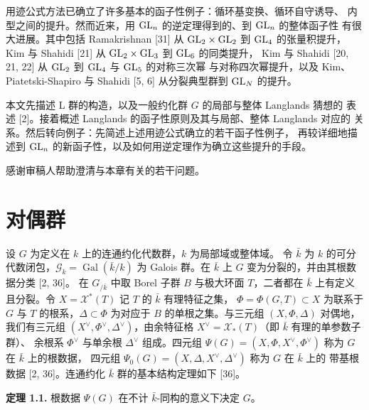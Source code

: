 用迹公式方法已确立了许多基本的函子性例子：循环基变换、循环自守诱导、
内型之间的提升。然而近来，用 $\mathrm{GL}_n$ 的逆定理得到的、到 $\mathrm{GL}_n$ 的整体函子性
有很大进展。其中包括 Ramakrishnan [31] 从 $\mathrm{GL}_2\times\mathrm{GL}_2$ 到 $\mathrm{GL}_4$
的张量积提升，Kim 与 Shahidi [21] 从 $\mathrm{GL}_2\times\mathrm{GL}_3$ 到 $\mathrm{GL}_6$ 的同类提升，
Kim 与 Shahidi [20, 21, 22] 从 $\mathrm{GL}_2$ 到 $\mathrm{GL}_4$ 与 $\mathrm{GL}_5$ 的对称三次幂
与对称四次幂提升，以及 Kim、Piatetski-Shapiro 与 Shahidi [5, 6]
从分裂典型群到 $\mathrm{GL}_N$ 的提升。

本文先描述 L 群的构造，以及一般约化群 $G$ 的局部与整体 Langlands 猜想的
表述 [2]。接着概述 Langlands 的函子性原则及其与局部、整体 Langlands 对应的
关系。然后转向例子：先简述上述用迹公式确立的若干函子性例子，
再较详细地描述到 $\mathrm{GL}_n$ 的新函子性，以及如何用逆定理作为确立这些提升的手段。

感谢审稿人帮助澄清与本章有关的若干问题。

\section{对偶群}

设 $G$ 为定义在 $k$ 上的连通约化代数群，$k$ 为局部域或整体域。
令 $\bar k$ 为 $k$ 的可分代数闭包，$\mathcal{G}_k=\operatorname{Gal}(\bar k/k)$
为 Galois 群。在 $\bar k$ 上 $G$ 变为分裂的，并由其根数据分类 [2, 36]。
在 $G_{/\bar k}$ 中取 Borel 子群 $B$ 与极大环面 $T$，二者都在 $\bar k$ 上有定义
且分裂。令 $X=\mathcal{X}^{*}(T)$ 记 $T$ 的 $\bar k$ 有理特征之集，
$\Phi=\Phi(G,T)\subset X$ 为联系于 $G$ 与 $T$ 的根系，$\Delta\subset\Phi$
为对应于 $B$ 的单根之集。与三元组 $(X,\Phi,\Delta)$ 对偶地，
我们有三元组 $(X^{\vee},\Phi^{\vee},\Delta^{\vee})$，由余特征格
$X^{\vee}=\mathcal{X}_{*}(T)$（即 $\bar k$ 有理的单参数子群）、
余根系 $\Phi^{\vee}$ 与单余根 $\Delta^{\vee}$ 组成。四元组
$\Psi(G)=(X,\Phi,X^{\vee},\Phi^{\vee})$ 称为 $G$ 在 $\bar k$ 上的根数据，
四元组 $\Psi_0(G)=(X,\Delta,X^{\vee},\Delta^{\vee})$ 称为 $G$ 在 $\bar k$ 上的
带基根数据 [2, 36]。连通约化 $\bar k$ 群的基本结构定理如下 [36]。

\par\medskip\noindent\textbf{定理 1.1.}\quad
根数据 $\Psi(G)$ 在不计 $\bar k$-同构的意义下决定 $G$。

